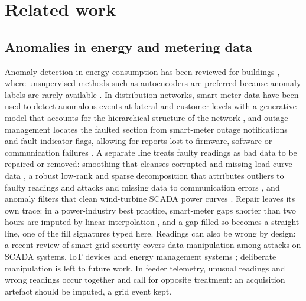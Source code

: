 \section{Related work}\label{sec:related}

\subsection{Anomalies in energy and metering data}\label{sec:rw-energy}

Anomaly detection in energy consumption has been reviewed for buildings \cite{himeur2021review}, where unsupervised methods such as autoencoders are preferred because anomaly labels are rarely available \cite{fan2018autoencoder}. In distribution networks, smart-meter data have been used to detect anomalous events at lateral and customer levels with a generative model that accounts for the hierarchical structure of the network \cite{moghaddass2018hierarchical}, and outage management locates the faulted section from smart-meter outage notifications and fault-indicator flags, allowing for reports lost to firmware, software or communication failures \cite{jiang2016outage}. A separate line treats faulty readings as bad data to be repaired or removed: smoothing that cleanses corrupted and missing load-curve data \cite{chen2010cleansing}, a robust low-rank and sparse decomposition that attributes outliers to faulty readings and attacks and missing data to communication errors \cite{mateos2013cleansing}, and anomaly filters that clean wind-turbine SCADA power curves \cite{morrison2022scada}. Repair leaves its own trace: in a power-industry best practice, smart-meter gaps shorter than two hours are imputed by linear interpolation \cite{peppanen2016imputation}, and a gap filled so becomes a straight line, one of the fill signatures typed here. Readings can also be wrong by design: a recent review of smart-grid security covers data manipulation among attacks on SCADA systems, IoT devices and energy management systems \cite{hassine2025security}; deliberate manipulation is left to future work. In feeder telemetry, unusual readings and wrong readings occur together and call for opposite treatment: an acquisition artefact should be imputed, a grid event kept.

